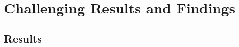 \documentclass[10pt,twocolumn,letterpaper]{article}
\begin{document}




\section{Challenging Results and Findings}\label{sec:results}

\subsection{Results}
\end{document}
